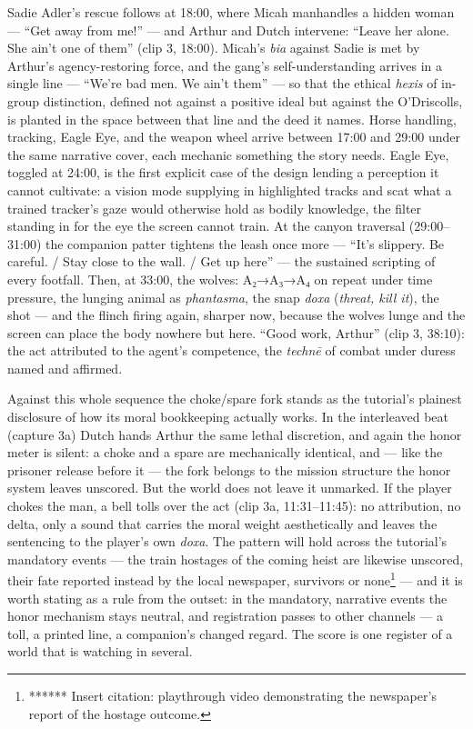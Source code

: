 Sadie Adler's rescue follows at 18:00, where Micah manhandles a hidden woman — ``Get away from me!'' — and Arthur and Dutch intervene: ``Leave her alone. She ain't one of them'' (clip 3, 18:00). Micah's \textit{bia} against Sadie is met by Arthur's agency-restoring force, and the gang's self-understanding arrives in a single line — ``We're bad men. We ain't them'' — so that the ethical \textit{hexis} of in-group distinction, defined not against a positive ideal but against the O'Driscolls, is planted in the space between that line and the deed it names. Horse handling, tracking, Eagle Eye, and the weapon wheel arrive between 17:00 and 29:00 under the same narrative cover, each mechanic something the story needs. Eagle Eye, toggled at 24:00, is the first explicit case of the design lending a perception it cannot cultivate: a vision mode supplying in highlighted tracks and scat what a trained tracker's gaze would otherwise hold as bodily knowledge, the filter standing in for the eye the screen cannot train. At the canyon traversal (29:00–31:00) the companion patter tightens the leash once more — ``It's slippery. Be careful. / Stay close to the wall. / Get up here'' — the sustained scripting of every footfall. Then, at 33:00, the wolves: A₂→A₃→A₄ on repeat under time pressure, the lunging animal as \textit{phantasma}, the snap \textit{doxa} (\textit{threat, kill it}), the shot — and the flinch firing again, sharper now, because the wolves lunge and the screen can place the body nowhere but here. ``Good work, Arthur'' (clip 3, 38:10): the act attributed to the agent's competence, the \textit{technē} of combat under duress named and affirmed.

Against this whole sequence the choke/spare fork stands as the tutorial's plainest disclosure of how its moral bookkeeping actually works. In the interleaved beat (capture 3a) Dutch hands Arthur the same lethal discretion, and again the honor meter is silent: a choke and a spare are mechanically identical, and — like the prisoner release before it — the fork belongs to the mission structure the honor system leaves unscored. But the world does not leave it unmarked. If the player chokes the man, a bell tolls over the act (clip 3a, 11:31–11:45): no attribution, no delta, only a sound that carries the moral weight aesthetically and leaves the sentencing to the player's own \textit{doxa}. The pattern will hold across the tutorial's mandatory events — the train hostages of the coming heist are likewise unscored, their fate reported instead by the local newspaper, survivors or none\footnote{****** Insert citation: playthrough video demonstrating the newspaper's report of the hostage outcome.} — and it is worth stating as a rule from the outset: in the mandatory, narrative events the honor mechanism stays neutral, and registration passes to other channels — a toll, a printed line, a companion's changed regard. The score is one register of a world that is watching in several.

